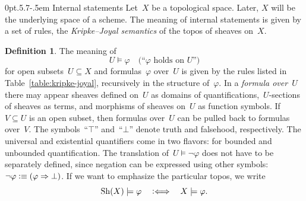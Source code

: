 \documentclass[10pt,reqno,a4paper]{amsbook}
\makeatletter
\theoremstyle{definition}
\newtheorem{defn}{Definition}[section]
\theoremstyle{plain}
\theoremstyle{remark}
\newcommand{\Sh}{\mathrm{Sh}}
\newcommand{\?}{\,{:}\,}
\renewcommand{\_}{\mathpunct{.}\,}
\newcommand{\Ll}{\vcentcolon\Longleftrightarrow}
\newcommand{\defequiv}{\vcentcolon\equiv}
\def\subsection{\@startsection{subsection}{2}%
  {0pt}{.5\linespacing\@plus.7\linespacing}{-.5em}%
  {\normalfont\bfseries}}
\makeatother
\begin{document}
\subsection{Internal statements}
Let~$X$ be a topological space. Later, $X$ will be the underlying space of a
scheme. The meaning of internal statements is given by a set of rules, the
\emph{Kripke--Joyal semantics} of the topos of sheaves on~$X$.

\begin{defn}\label{defn:kripke-joyal}The meaning of
\[ U \models \varphi \quad\text{(``$\varphi$ holds on $U$'')} \]
for open subsets~$U \subseteq X$ and formulas~$\varphi$ over~$U$ is given by
the rules listed in Table~\ref{table:kripke-joyal}, recursively in the structure of~$\varphi$.
In a \emph{formula over~$U$} there may appear sheaves defined on~$U$ as domains
of quantifications,~$U$-sections of sheaves as terms, and morphisms of sheaves
on~$U$ as function symbols. If~$V \subseteq U$ is an open subset, then formulas
over~$U$ can be pulled back to formulas over~$V$. The symbols~``$\top$'' and~``$\bot$'' denote truth
and falsehood, respectively. The universal and existential quantifiers come in
two flavors: for bounded and unbounded quantification.
The translation of~$U \models \neg\varphi$ does not have to be separately defined, since
negation can be expressed using other symbols: $\neg\varphi \defequiv (\varphi
\Rightarrow \bot)$. If we want to emphasize the particular topos, we write
\[ \Sh(X) \models \varphi \quad\Ll\quad X \models \varphi. \]
\end{defn}
\end{document}
